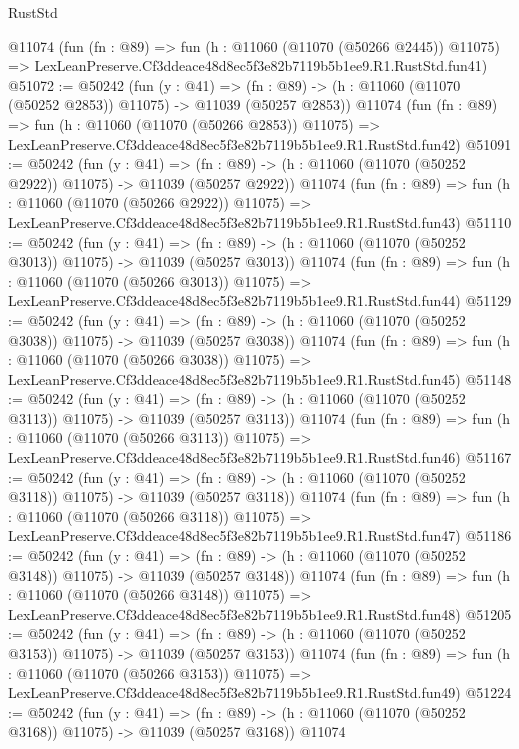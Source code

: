 \begin{lexlean}{RustStd}
\begin{coremodule}
    @11074
    (fun (fn : @89) =>
    fun (h : @11060 (@11070 (@50266 @2445)) @11075) =>
    LexLeanPreserve.Cf3ddeace48d8ec5f3e82b7119b5b1ee9.R1.RustStd.fun41)
@51072 := @50242
    (fun (y : @41) =>
    (fn : @89) -> (h : @11060 (@11070 (@50252 @2853)) @11075) -> @11039 (@50257 @2853))
    @11074
    (fun (fn : @89) =>
    fun (h : @11060 (@11070 (@50266 @2853)) @11075) =>
    LexLeanPreserve.Cf3ddeace48d8ec5f3e82b7119b5b1ee9.R1.RustStd.fun42)
@51091 := @50242
    (fun (y : @41) =>
    (fn : @89) -> (h : @11060 (@11070 (@50252 @2922)) @11075) -> @11039 (@50257 @2922))
    @11074
    (fun (fn : @89) =>
    fun (h : @11060 (@11070 (@50266 @2922)) @11075) =>
    LexLeanPreserve.Cf3ddeace48d8ec5f3e82b7119b5b1ee9.R1.RustStd.fun43)
@51110 := @50242
    (fun (y : @41) =>
    (fn : @89) -> (h : @11060 (@11070 (@50252 @3013)) @11075) -> @11039 (@50257 @3013))
    @11074
    (fun (fn : @89) =>
    fun (h : @11060 (@11070 (@50266 @3013)) @11075) =>
    LexLeanPreserve.Cf3ddeace48d8ec5f3e82b7119b5b1ee9.R1.RustStd.fun44)
@51129 := @50242
    (fun (y : @41) =>
    (fn : @89) -> (h : @11060 (@11070 (@50252 @3038)) @11075) -> @11039 (@50257 @3038))
    @11074
    (fun (fn : @89) =>
    fun (h : @11060 (@11070 (@50266 @3038)) @11075) =>
    LexLeanPreserve.Cf3ddeace48d8ec5f3e82b7119b5b1ee9.R1.RustStd.fun45)
@51148 := @50242
    (fun (y : @41) =>
    (fn : @89) -> (h : @11060 (@11070 (@50252 @3113)) @11075) -> @11039 (@50257 @3113))
    @11074
    (fun (fn : @89) =>
    fun (h : @11060 (@11070 (@50266 @3113)) @11075) =>
    LexLeanPreserve.Cf3ddeace48d8ec5f3e82b7119b5b1ee9.R1.RustStd.fun46)
@51167 := @50242
    (fun (y : @41) =>
    (fn : @89) -> (h : @11060 (@11070 (@50252 @3118)) @11075) -> @11039 (@50257 @3118))
    @11074
    (fun (fn : @89) =>
    fun (h : @11060 (@11070 (@50266 @3118)) @11075) =>
    LexLeanPreserve.Cf3ddeace48d8ec5f3e82b7119b5b1ee9.R1.RustStd.fun47)
@51186 := @50242
    (fun (y : @41) =>
    (fn : @89) -> (h : @11060 (@11070 (@50252 @3148)) @11075) -> @11039 (@50257 @3148))
    @11074
    (fun (fn : @89) =>
    fun (h : @11060 (@11070 (@50266 @3148)) @11075) =>
    LexLeanPreserve.Cf3ddeace48d8ec5f3e82b7119b5b1ee9.R1.RustStd.fun48)
@51205 := @50242
    (fun (y : @41) =>
    (fn : @89) -> (h : @11060 (@11070 (@50252 @3153)) @11075) -> @11039 (@50257 @3153))
    @11074
    (fun (fn : @89) =>
    fun (h : @11060 (@11070 (@50266 @3153)) @11075) =>
    LexLeanPreserve.Cf3ddeace48d8ec5f3e82b7119b5b1ee9.R1.RustStd.fun49)
@51224 := @50242
    (fun (y : @41) =>
    (fn : @89) -> (h : @11060 (@11070 (@50252 @3168)) @11075) -> @11039 (@50257 @3168))
    @11074

\end{coremodule}
\end{lexlean}
